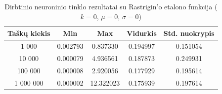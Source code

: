 \begin{table}[H]
    \centering
    \begin{tabular}{|c|c|c|c|c|}
        \hline
        \textbf{Taškų kiekis} & \textbf{Min} & \textbf{Max} & \textbf{Vidurkis} & \textbf{Std. nuokrypis} \\ \hline
        1 000        & 0.002793 & 0.837330 & 0.194997 & 0.151054 \\ \hline
        10 000       & 0.000079 & 4.936561 & 0.187873 & 0.249931 \\ \hline
        100 000      & 0.000008 & 2.920056 & 0.177929 & 0.195614 \\ \hline
        1 000 000    & 0.000002 & 12.322023 & 0.175939 & 0.197614 \\ \hline
    \end{tabular}
    \caption{Dirbtinio neuroninio tinklo rezultatai su Rastrigin'o etalono funkcija ($k = 0$, $\mu = 0$, $\sigma = 0$)}
\end{table}